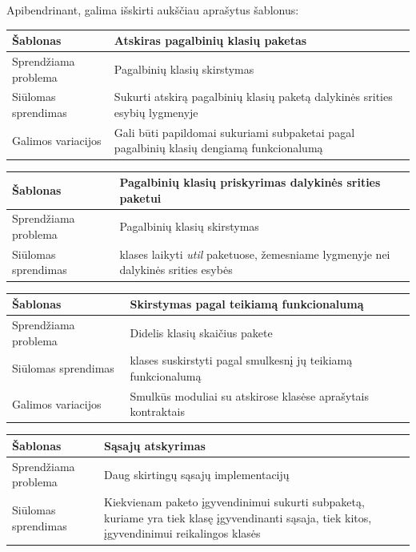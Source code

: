 Apibendrinant, galima išskirti aukščiau aprašytus šablonus:
\begin{center}
    \begin{tabular}{|p{5cm}|p{10cm}|}
        \hline
        Šablonas &  Atskiras pagalbinių klasių paketas \\ [0.5ex]
        \hline\hline
        Sprendžiama problema & Pagalbinių klasių skirstymas\\
        \hline
        Siūlomas sprendimas & Sukurti atskirą pagalbinių klasių paketą dalykinės srities esybių lygmenyje \\
        \hline
        Galimos variacijos & Gali būti papildomai sukuriami subpaketai pagal pagalbinių klasių dengiamą funkcionalumą \\
        \hline
    \end{tabular}
    \newline
    \newline

    \begin{tabular}{|p{5cm}|p{10cm}|}
        \hline
        Šablonas &  Pagalbinių klasių priskyrimas dalykinės srities paketui \\ [0.5ex]
        \hline\hline
        Sprendžiama problema & Pagalbinių klasių skirstymas\\
        \hline
        Siūlomas sprendimas & klases laikyti \textit{util} paketuose, žemesniame lygmenyje nei dalykinės srities esybės \\
        \hline
    \end{tabular}
    \newline
    \newline

    \begin{tabular}{|p{5cm}|p{10cm}|}
        \hline
        Šablonas &  Skirstymas pagal teikiamą funkcionalumą \\ [0.5ex]
        \hline\hline
        Sprendžiama problema & Didelis klasių skaičius pakete\\
        \hline
        Siūlomas sprendimas & klases suskirstyti pagal smulkesnį jų teikiamą funkcionalumą \\
        \hline
        Galimos variacijos & Smulkūs moduliai su atskirose klasėse aprašytais kontraktais \\
        \hline
    \end{tabular}
    \newline
    \newline

    \begin{tabular}{|p{5cm}|p{10cm}|}
        \hline
        Šablonas & Sąsajų atskyrimas \\ [0.5ex]
        \hline\hline
        Sprendžiama problema & Daug skirtingų sąsajų implementacijų\\
        \hline
        Siūlomas sprendimas & Kiekvienam paketo įgyvendinimui sukurti subpaketą, kuriame yra tiek klasę įgyvendinanti sąsaja, tiek kitos, įgyvendinimui reikalingos klasės \\
        \hline
    \end{tabular}
    \newline
    \newline


\end{center}
